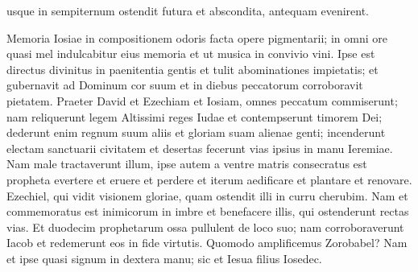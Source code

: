 \begin{biblechapter}
\begin{biblechapter}
\begin{biblechapter}
\begin{biblechapter}
\begin{biblechapter}
\begin{biblechapter}
\begin{biblechapter}
\begin{biblechapter}
\begin{biblechapter}
\begin{biblechapter}
\begin{biblechapter}
\begin{biblechapter}
\begin{biblechapter}
\begin{biblechapter}
\begin{biblechapter}
\begin{biblechapter}
\begin{biblechapter}
\begin{biblechapter}
\begin{biblechapter}
\begin{biblechapter}
\begin{biblechapter}
\begin{biblechapter}
\begin{biblechapter}
\begin{biblechapter}
\begin{biblechapter}
\begin{biblechapter}
\begin{biblechapter}
\begin{biblechapter}
\begin{biblechapter}
\begin{biblechapter}
\begin{biblechapter}
\begin{biblechapter}
\begin{biblechapter}
\begin{biblechapter}
\begin{biblechapter}
\begin{biblechapter}
\begin{biblechapter}
\begin{biblechapter}
\begin{biblechapter}
\begin{biblechapter}
\begin{biblechapter}
\begin{biblechapter}
\begin{biblechapter}
\begin{biblechapter}
\begin{biblechapter}
\begin{biblechapter}
\begin{biblechapter}
\begin{biblechapter}
 usque in sempiternum ostendit futura
 \verse et abscondita, antequam evenirent.
 
\begin{biblechapter}
\verse Memoria Iosiae in compositionem odoris
 facta opere pigmentarii;
 \verse in omni ore quasi mel indulcabitur eius memoria
 et ut musica in convivio vini.
 \verse Ipse est directus divinitus in paenitentia gentis
 et tulit abominationes impietatis;
 \verse et gubernavit ad Dominum cor suum
 et in diebus peccatorum corroboravit pietatem.
 \verse Praeter David et Ezechiam et Iosiam,
 omnes peccatum commiserunt;
 \verse nam reliquerunt legem Altissimi reges Iudae
 et contempserunt timorem Dei;
 \verse dederunt enim regnum suum aliis
 et gloriam suam alienae genti;
 \verse incenderunt electam sanctuarii civitatem
 et desertas fecerunt vias ipsius in manu Ieremiae.
 \verse Nam male tractaverunt illum,
 ipse autem a ventre matris consecratus est propheta
 evertere et eruere et perdere
 et iterum aedificare et plantare et renovare.
 \verse Ezechiel, qui vidit visionem gloriae,
 quam ostendit illi in curru cherubim.
 \verse Nam et commemoratus est inimicorum in imbre
 et benefacere illis, qui ostenderunt rectas vias.
 \verse Et duodecim prophetarum ossa pullulent de loco suo;
 nam corroboraverunt Iacob
 et redemerunt eos in fide virtutis.
 \verse Quomodo amplificemus Zorobabel?
 Nam et ipse quasi signum in dextera manu;
 \verse sic et Iesua filius Iosedec.

\end{biblechapter}
\end{biblechapter}
\end{biblechapter}
\end{biblechapter}
\end{biblechapter}
\end{biblechapter}
\end{biblechapter}
\end{biblechapter}
\end{biblechapter}
\end{biblechapter}
\end{biblechapter}
\end{biblechapter}
\end{biblechapter}
\end{biblechapter}
\end{biblechapter}
\end{biblechapter}
\end{biblechapter}
\end{biblechapter}
\end{biblechapter}
\end{biblechapter}
\end{biblechapter}
\end{biblechapter}
\end{biblechapter}
\end{biblechapter}
\end{biblechapter}
\end{biblechapter}
\end{biblechapter}
\end{biblechapter}
\end{biblechapter}
\end{biblechapter}
\end{biblechapter}
\end{biblechapter}
\end{biblechapter}
\end{biblechapter}
\end{biblechapter}
\end{biblechapter}
\end{biblechapter}
\end{biblechapter}
\end{biblechapter}
\end{biblechapter}
\end{biblechapter}
\end{biblechapter}
\end{biblechapter}
\end{biblechapter}
\end{biblechapter}
\end{biblechapter}
\end{biblechapter}
\end{biblechapter}
\end{biblechapter}

